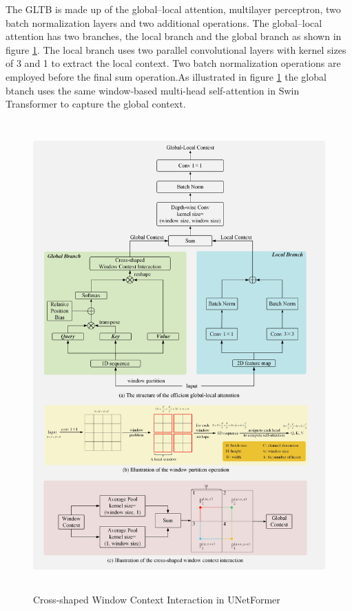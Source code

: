 The GLTB is made up of the global–local attention, multilayer perceptron, two batch normalization layers and two additional operations. The global–local attention has two  branches, the local branch and the global branch as shown in figure \ref{fig:unetformer-besar}. The local branch uses two parallel convolutional layers with kernel sizes of 3 and 1 to extract the local context. Two batch normalization operations are employed before the final sum operation.As illustrated in figure \ref{fig:unetformer-besar} the global btanch uses the same window-based multi-head self-attention in Swin Transformer to capture the global context.
\FloatBarrier
\begin{figure}[ht]
\includegraphics[width=13.5cm, height=18cm]{images/unetformer besar.jpg}
\centering
\caption{Cross-shaped Window Context Interaction in UNetFormer \protect\cite{unetformer}}
\label{fig:unetformer-besar}
\end{figure}
\FloatBarrier

